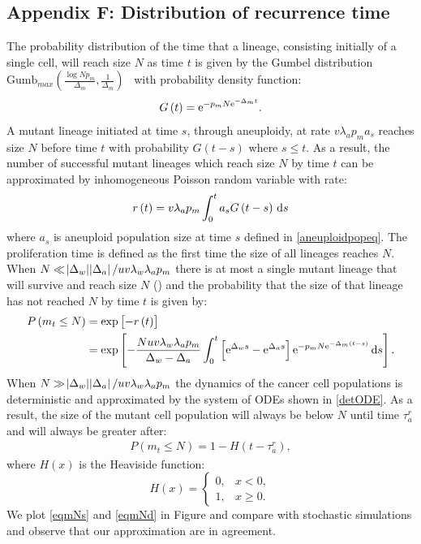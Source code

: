 \documentclass[12pt]{extarticle}
\renewcommand{\d}[1]{\ensuremath{\operatorname{d}\!{#1}}}
\renewcommand{\d}{{\rm d}}
\newcommand{\e}{{\rm e}}
\begin{document}
\begin{appendices}
\section*{Appendix F: Distribution of recurrence time}
The probability distribution of the time that a lineage, consisting initially of a single cell, will reach size $N$ as time $t$ is given by the Gumbel distribution $\text{Gumb}_{max}\left(\frac{\log Np_m}{\Delta_m},\frac{1}{\Delta_m}\right)$~\citep{avanzini2019cancer} with probability density function:
\begin{align*}
G\left(t\right)=\e^{-p_mN\e^{-\Delta_mt}}.
\end{align*}
A mutant lineage initiated at time $s$, through aneuploidy, at rate $v\lambda_ap_ma_s$ reaches size $N$ before time $t$ with probability $G\left(t-s\right)$ where $s\leq t$. As a result, the number of successful mutant lineages which reach size $N$ by time $t$ can be approximated by inhomogeneous Poisson random variable with rate:
\begin{align*}
r\left(t\right)=v\lambda_ap_m\int_0^t a_sG\left(t-s\right)\,\d s
\end{align*}
where $a_s$ is aneuploid population size at time $s$ defined in \cref{aneuploidpopeq}. The proliferation time is defined as the first time the size of all lineages reaches $N$. When $N\ll\abs{\Delta_w}\abs{\Delta_a}/uv\lambda_w\lambda_ap_m$ there is at most a single mutant lineage that will survive and reach size $N$ () and the probability that the size of that lineage has not reached $N$ by time $t$ is given by:
\begin{align}\nonumber
P\left(m_t\leq N\right)&=\exp\left[-r\left(t\right)\right]\\ \label{eqmNs}
&=\exp\left[-\frac{Nuv\lambda_w\lambda_ap_m}{\Delta_w-\Delta_a}\int_0^t\left[\e^{\Delta_ws}-\e^{\Delta_as}\right]\e^{-p_mN\e^{-\Delta_m\left(t-s\right)}}\,\d s\right].
\end{align}
When $N\gg\abs{\Delta_w}\abs{\Delta_a}/uv\lambda_w\lambda_ap_m$ the dynamics of the cancer cell populations is deterministic and approximated by the system of ODEs shown in \cref{detODE}. As a result, the size of the mutant cell population will always be below $N$ until time $\tau_a^r$ and will always be greater after:
\begin{align}\label{eqmNd}
P\left(m_t\leq N\right)=1-H\left(t-\tau_a^r\right),
\end{align}
where $H(x)$ is the Heaviside function:
\begin{equation*}
H\left(x\right) = \begin{cases}
    0 ,&
  x<0 ,\\ 
  1 ,&
  x\geq0 .
  \end{cases}
\end{equation*}
We plot \cref{eqmNs} and \cref{eqmNd} in Figure and compare with stochastic simulations and observe that our approximation are in agreement. 


\end{appendices}
\end{document}
